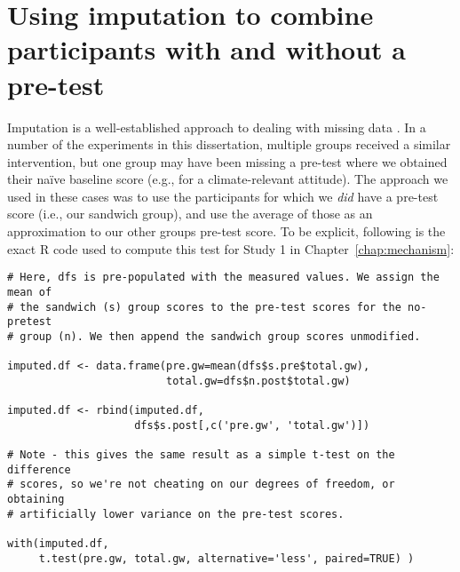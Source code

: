 \chapter{Using imputation to combine participants with and without a pre-test}
\label{app:imputation}

Imputation is a well-established approach to dealing with missing data
\parencite[for an overview see][Chapter 20]{fox_applied_2008}. In a number of
the experiments in this dissertation, multiple groups received a similar
intervention, but one group may have been missing a pre-test where we obtained
their na\"ive baseline score (e.g., for a climate-relevant attitude). The
approach we used in these cases was to use the participants for which we
\emph{did} have a pre-test score (i.e., our sandwich group), and use the average
of those as an approximation to our other groups pre-test score. To be explicit,
following is the exact R code used to compute this test for Study 1 in
Chapter~\ref{chap:mechanism}:

\begin{verbatim}
# Here, dfs is pre-populated with the measured values. We assign the mean of
# the sandwich (s) group scores to the pre-test scores for the no-pretest
# group (n). We then append the sandwich group scores unmodified.

imputed.df <- data.frame(pre.gw=mean(dfs$s.pre$total.gw),
                         total.gw=dfs$n.post$total.gw)

imputed.df <- rbind(imputed.df,
                    dfs$s.post[,c('pre.gw', 'total.gw')])

# Note - this gives the same result as a simple t-test on the difference
# scores, so we're not cheating on our degrees of freedom, or obtaining
# artificially lower variance on the pre-test scores.

with(imputed.df,
     t.test(pre.gw, total.gw, alternative='less', paired=TRUE) )
\end{verbatim}
